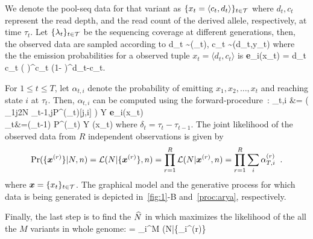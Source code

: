 We denote the pool-seq data for that variant as $\{x_t =
\langle c_t,d_t \rangle\}_{t\in{\cal T}}$ where $d_t, c_t$ represent the read depth,
and the read count of the derived allele, respectively, at time
$\tau_t$. Let $\{\lambda_t\}_{t\in{\cal T}}$ be the sequencing coverage at different 
generations, then, the observed data are sampled according to 
\beq
d_t \sim \poiss(\lambda_t), \hspace{1in} c_t \sim \bino(d_t,y_t)
\eeq
where the the emission probabilities for a observed tuple  $x_t=\langle d_t, 
c_t\rangle $ is
\beq
	{\bf e}_{i}(x_t) = {d_t \choose c_t} \left( \right)^{c_t}\left 
	(1- 
	 \right)^{d_t-c_t}.
\eeq
{}


For $1\le t\le T$, let $\alpha_{t,i}$ denote the probability of
emitting $x_1,x_2,\ldots,x_t$ and reaching state $i$ at
$\tau_t$. Then, $\alpha_{t,i}$ can be computed using the
forward-procedure~\cite{durbin1998biological}:
\beq
	\alpha_{t,i} &= \left( \sum_{1\le j\le 2N} 
	\alpha_{t-1,j}\;P^{(\delta_t)}[j,i] \right) Y {\bf 
	e}_{i}(x_t)\;\; \\
	\alpha_t&=(\alpha_{t-1}) P^{(\delta_t)} Y \bfe(x_t)
	\label{eq:hmm}
\eeq
where $\delta_t=\tau_t-\tau_{t-1}$. The joint likelihood of the
observed data from $R$ independent observations is given by
\begin{equation}
\operatorname{Pr}(\{\bm{x}^{(r)}\}|N,n) =	{\cal L}(N|\{\bm{x}^{(r)}\}, 
n)=\prod_{r=1}^R{\cal L}(N|\bm{x}^{(r)},n)
	 = 
	\prod_{r=1}^R \sum_i\alpha_{T,i}^{(r)}\;\;.
	\label{eq:hmmlik}
\end{equation}
where $\bm{x}=\{x_t\}_{t\in {\cal T}}$. The graphical model and the generative 
process for which data is being generated is depicted in~\ref{fig:1}-B 
and~\ref{proc:arya}, respectively.

Finally, the last step is to find the  $\widehat{N}$ in which maximizes the likelihood of 
the all the $M$ variants in whole genome:
\beq
\hN =  \prod_i^M \Lc(N|\{_i^{(r)}\} 
\label{eq:mlen}
\eeq

